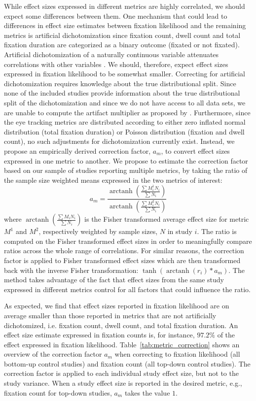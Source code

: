 \documentclass[english,natbib,man,floatsintext]{apa6}
\DeclareMathOperator\arctanh{arctanh}
\begin{document}
While effect sizes expressed in different metrics are highly correlated, we should expect some differences between them. One mechanism that could lead to differences in effect size estimates between fixation likelihood and the remaining metrics is artificial dichotomization since fixation count, dwell count and total fixation duration are categorized as a binary outcome (fixated or not fixated). Artificial dichotomization of a naturally continuous variable attenuates correlations with other variables \citep{hunter2004a}. We should, therefore, expect effect sizes expressed in fixation likelihood to be somewhat smaller. Correcting for artificial dichotomization requires knowledge about the true distributional split. Since none of the included studies provide information about the true distributional split of the dichotomization and since we do not have access to all data sets, we are unable to compute the artifact multiplier as proposed by \cite{hunter2004a}. Furthermore, since the eye tracking metrics are distributed according to either zero inflated normal distribution (total fixation duration) or Poisson distribution (fixation and dwell count), no such adjustments for dichotomization currently exist. Instead, we propose an empirically derived correction factor, $a_m$, to convert effect sizes expressed in one metric to another. We propose to estimate the correction factor based on our sample of studies reporting multiple metrics, by taking the ratio of the sample size weighted means expressed in the two metrics of interest:
%
\begin{equation}
\label{eq:metrics_correction}
a_m = \frac{\arctanh \left( \frac{\sum M_i^1 N_i}{\sum N_i} \right)}{\arctanh \left( \frac{\sum M_i^2 N_i}{\sum N_i} \right)}
\end{equation}
%
where $\arctanh \left( \frac{\sum M_i N_i}{\sum N_i} \right)$ is the Fisher transformed average effect size for metric $M^1$ and $M^2$, respectively weighted by sample sizes, $N$ in study $i$. The ratio is computed on the Fisher transformed effect sizes in order to meaningfully compare ratios across the whole range of correlations. For similar reasons, the correction factor is applied to Fisher transformed effect sizes which are then transformed back with the inverse Fisher transformation: $\tanh(\arctanh(r_i)*a_m)$. The method takes advantage of the fact that effect sizes from the same study expressed in different metrics control for all factors that could influence the ratio.    

As expected, we find that effect sizes reported in fixation likelihood are on average smaller than those reported in metrics that are not artificially dichotomized, i.e. fixation count, dwell count, and total fixation duration. An effect size estimate expressed in fixation counts is, for instance, $97.2\%$ of the effect expressed in fixation likelihood. Table~\ref{tab:metric_correction} shows an overview of the correction factor $a_m$ when correcting to fixation likelihood (all bottom-up control studies) and fixation count (all top-down control studies). The correction factor is applied to each individual study effect size, but not to the study variance. When a study effect size is reported in the desired metric, e.g., fixation count for top-down studies, $a_m$ takes the value $1$.  
\end{document}
